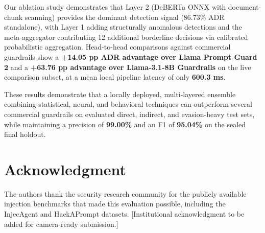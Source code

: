 \documentclass[conference]{IEEEtran}
\begin{document}
Our ablation study demonstrates that Layer 2 (DeBERTa ONNX with document-chunk scanning) provides the dominant detection signal (86.73\% ADR standalone), with Layer 1 adding structurally anomalous detections and the meta-aggregator contributing 12 additional borderline decisions via calibrated probabilistic aggregation. Head-to-head comparisons against commercial guardrails show a \textbf{+14.05 pp ADR advantage over Llama Prompt Guard 2} and a \textbf{+63.76 pp advantage over Llama-3.1-8B Guardrails} on the live comparison subset, at a mean local pipeline latency of only \textbf{600.3 ms}.


These results demonstrate that a locally deployed, multi-layered ensemble combining statistical, neural, and behavioral techniques can outperform several commercial guardrails on evaluated direct, indirect, and evasion-heavy test sets, while maintaining a precision of \textbf{99.00\%} and an F1 of \textbf{95.04\%} on the sealed final holdout.



\section{Acknowledgment}

The authors thank the security research community for the publicly available injection benchmarks that made this evaluation possible, including the InjecAgent and HackAPrompt datasets. [Institutional acknowledgment to be added for camera-ready submission.]
\end{document}
